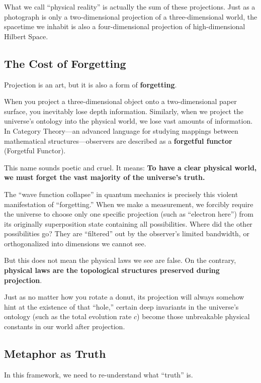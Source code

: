 \documentclass[11pt,a4paper,twoside]{book}
\begin{document}
What we call ``physical reality'' is actually the sum of these projections. Just as a photograph is only a two-dimensional projection of a three-dimensional world, the spacetime we inhabit is also a four-dimensional projection of high-dimensional Hilbert Space.

\subsection{The Cost of Forgetting}

Projection is an art, but it is also a form of \textbf{forgetting}.

When you project a three-dimensional object onto a two-dimensional paper surface, you inevitably lose depth information. Similarly, when we project the universe's ontology into the physical world, we lose vast amounts of information. In Category Theory---an advanced language for studying mappings between mathematical structures---observers are described as a \textbf{forgetful functor} (Forgetful Functor).

This name sounds poetic and cruel. It means: \textbf{To have a clear physical world, we must forget the vast majority of the universe's truth.}

The ``wave function collapse'' in quantum mechanics is precisely this violent manifestation of ``forgetting.'' When we make a measurement, we forcibly require the universe to choose only one specific projection (such as ``electron here'') from its originally superposition state containing all possibilities. Where did the other possibilities go? They are ``filtered'' out by the observer's limited bandwidth, or orthogonalized into dimensions we cannot see.

But this does not mean the physical laws we see are false. On the contrary, \textbf{physical laws are the topological structures preserved during projection}.

Just as no matter how you rotate a donut, its projection will always somehow hint at the existence of that ``hole,'' certain deep invariants in the universe's ontology (such as the total evolution rate $c$) become those unbreakable physical constants in our world after projection.

\subsection{Metaphor as Truth}

In this framework, we need to re-understand what ``truth'' is.
\end{document}
